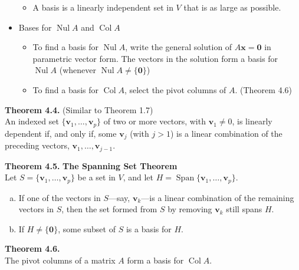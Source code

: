 \documentclass[10pt]{book}
\newenvironment{boxthm}{\begin{mdframed}[backgroundcolor=gray!30,nobreak=true]}{\end{mdframed}}
\newcommand{\vect}[1]{\ensuremath{\boldsymbol{\mathbf{#1}}}}
\DeclareMathOperator{\Span}{Span}
\DeclareMathOperator{\Nul}{Nul}
\DeclareMathOperator{\Col}{Col}
\newcommand{\Axz}{A\vect{x}=\vect{0}}
\newcommand{\vectsetvp}{\{\vect{v}_1,\ldots,\vect{v}_p\}}
\begin{document}
\begin{itemize}
\begin{itemize}
			\item A basis is a linearly independent set in $V$ that is as large as possible.
		\end{itemize}
	\item Bases for $\Nul A$ and $\Col A$
		\begin{itemize}
			\item To find a basis for $\Nul A$, write the general solution of $\Axz$ in parametric vector form. The vectors in the solution form a basis for $\Nul A$ (whenever $\Nul A \neq \{\vect{0}\}$)
			\item To find a basis for $\Col A$, select the pivot columns of $A$. (Theorem 4.6)
		\end{itemize}
\end{itemize}
\begin{boxthm}
	\textbf{Theorem 4.4.} (Similar to Theorem 1.7) \\
	An indexed set $\vectsetvp$ of two or more vectors, with $\vect{v}_1\neq 0$, is linearly dependent if, and only if, some $\vect{v}_j$ (with $j>1$) is a linear combination of the preceding vectors, $\vect{v}_1,\ldots,\vect{v}_{j-1}$.
\end{boxthm}
\begin{boxthm}
	\textbf{Theorem 4.5.}
	\textbf{The Spanning Set Theorem} \\
	Let $S=\vectsetvp$ be a set in $V$, and let $H=\Span\vectsetvp$.
	\begin{enumerate}[a.]
		\item If one of the vectors in $S$---say, $\vect{v}_k$---is a linear combination of the remaining vectors in $S$, then the set formed from $S$ by removing $\vect{v}_k$ still spans $H$.
		\item If $H\neq\{\vect{0}\}$, some subset of $S$ is a basis for $H$.
	\end{enumerate}
\end{boxthm}
\begin{boxthm}
	\textbf{Theorem 4.6.} \\
	The pivot columns of a matrix $A$ form a basis for $\Col A$.
\end{boxthm}


\newpage


\end{document}
